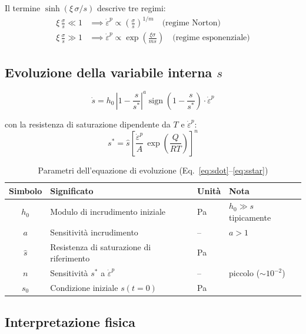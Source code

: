 \documentclass[11pt,a4paper]{article}
\newcommand{\epdot}{\dot{\varepsilon}^{p}}
\newcommand{\sdot}{\dot{s}}
\newcommand{\sstar}{s^{*}}
\begin{document}
Il termine $\sinh(\xi\,\sigma/s)$ descrive tre regimi:
\begin{align}
  \xi\,\frac{\sigma}{s} \ll 1 &\implies \epdot \propto \left(\frac{\sigma}{s}\right)^{1/m}
  \quad \text{(regime Norton)} \label{eq:norton}\\
  \xi\,\frac{\sigma}{s} \gg 1 &\implies \epdot \propto \exp\!\left(\frac{\xi\sigma}{ms}\right)
  \quad \text{(regime esponenziale)} \label{eq:exp}
\end{align}

\subsection{Evoluzione della variabile interna \texorpdfstring{$s$}{s}}

\begin{equation}
  \boxed{
    \sdot = h_0\,\left|1 - \frac{s}{\sstar}\right|^{a}
    \operatorname{sign}\!\left(1 - \frac{s}{\sstar}\right)\cdot\epdot
  }
  \label{eq:sdot}
\end{equation}

con la resistenza di saturazione dipendente da $T$ e $\epdot$:
\begin{equation}
  \boxed{
    \sstar = \hat{s}\left[\frac{\epdot}{A}\,\exp\!\left(\frac{Q}{RT}\right)\right]^{n}
  }
  \label{eq:sstar}
\end{equation}

\begin{table}[H]
  \centering
  \caption{Parametri dell'equazione di evoluzione (Eq.~\ref{eq:sdot}--\ref{eq:sstar})}
  \begin{tabular}{clll}
    \toprule
    Simbolo & Significato & Unità & Nota \\
    \midrule
    $h_0$   & Modulo di incrudimento iniziale & \si{\pascal} & $h_0 \gg s$ tipicamente \\
    $a$     & Sensitività incrudimento & -- & $a > 1$ \\
    $\hat{s}$ & Resistenza di saturazione di riferimento & \si{\pascal} & \\
    $n$     & Sensitività $\sstar$ a $\epdot$ & -- & piccolo ($\sim 10^{-2}$) \\
    $s_0$   & Condizione iniziale $s(t=0)$ & \si{\pascal} & \\
    \bottomrule
  \end{tabular}
\end{table}

\subsection{Interpretazione fisica}
\end{document}
